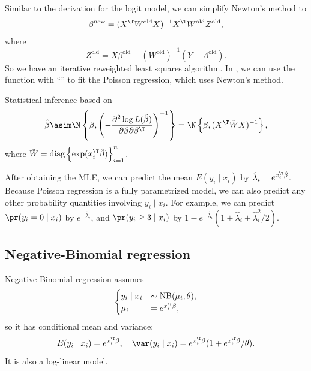 Similar to the derivation for the logit model, we can simplify Newton's
method to
\[
\beta^{\text{new}}=(X^{\T}W^{\text{old}}X)^{-1}X^{\T}W^{\text{old}}Z^{\text{old}},
\]
where 
\[
Z^{\text{old}}=X\beta^{\text{old}}+(W^{\text{old}})^{-1}(Y-\Lambda^{\text{old}}).
\]
So we have an iterative reweighted least squares algorithm. In , we can use the  function with ``'' to fit the Poisson regression, which uses Newton's method. 
 

Statistical inference based on 
\[
\hat{\beta}\asim\N\left\{ \beta,\left(-\frac{\partial^{2}\log L(\hat{\beta})}{\partial\beta\partial\beta^{\T}}\right)^{-1}\right\} =\N\left\{ \beta,(X^{\T}\hat{W}X)^{-1}\right\} ,
\]
where $\hat{W}=\text{diag}\left\{ \exp(x_{i}^{\T}\hat{\beta})\right\} _{i=1}^{n}$. 


After obtaining the MLE, we can predict the mean $E(y_i \mid x_i)$ by $ \hat{\lambda}_i =  e^{x_i^{\T} \hat{\beta}} $. Because Poisson regression is a fully parametrized model, we can also predict any other probability quantities involving $y_i \mid x_i$. For example, we can predict  $\pr(y_i = 0  \mid x_i)$ by $e^{- \hat{\lambda}_i }$, and $\pr(y_i \geq 3 \mid x_i) $ by $1 - e^{- \hat{\lambda}_i } (1 + \hat{\lambda}_i  + \hat{\lambda}_i ^2/2 )$. 




\subsection{Negative-Binomial regression}

Negative-Binomial regression assumes 
\begin{align*}
\begin{cases}
y_{i}  \mid x_{i} &\sim\text{NB}(\mu_{i},\theta),\\
\mu_{i} & =e^{x_{i}^{\T}\beta},
\end{cases}
\end{align*}
so it has conditional mean and variance:
$$
E (y_{i}  \mid x_{i} ) = e^{x_{i}^{\T}\beta} ,\quad 
\var (y_{i}  \mid x_{i} ) = e^{x_{i}^{\T}\beta} (1+e^{x_{i}^{\T}\beta} / \theta) . 
$$
It is also a log-linear model. 


